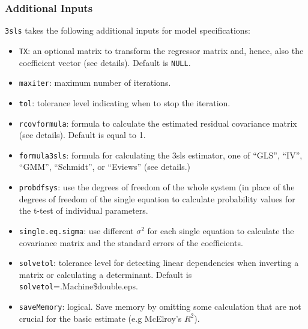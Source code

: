 \subsubsection{Additional Inputs}
\texttt{3sls} takes the following additional inputs for model
specifications:
\begin{itemize}
\item \texttt{TX}: an optional matrix to transform the regressor
matrix and, hence, also the coefficient vector (see details). Default is \texttt{NULL}.
\item \texttt{maxiter}: maximum number of iterations.
\item \texttt{tol}: tolerance level indicating when to stop the iteration.
\item \texttt{rcovformula}: formula to calculate the estimated residual covariance
matrix (see details). Default is equal to 1.
\item \texttt{formula3sls}: formula for calculating the 3sls estimator, one of ``GLS'',
``IV'', ``GMM'', ``Schmidt'', or ``Eviews'' (see details.)
\item \texttt{probdfsys}: use the degrees of freedom of the whole system
(in place of the degrees of freedom of the single equation to calculate probability
values for the t-test of individual parameters. 
\item \texttt{single.eq.sigma}: use different $\sigma^2$ for each single
equation to calculate the covariance matrix and the standard errors of the coefficients.
\item \texttt{solvetol}: tolerance level for detecting linear dependencies when 
inverting a matrix or calculating a determinant. Default is \texttt {solvetol}=.Machine\$double.eps.
\item \texttt{saveMemory}: logical. Save memory by omitting some calculation that are
not crucial for the basic estimate (e.g McElroy's $R^2$).
\end{itemize}
